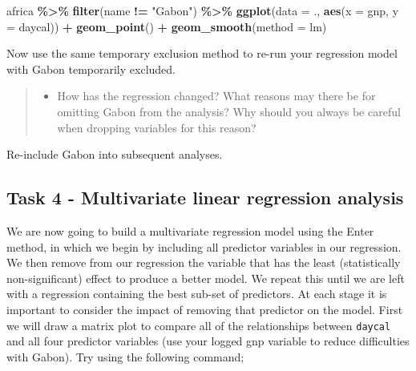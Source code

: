 \documentclass[
]{book}
\newenvironment{Shaded}{\begin{snugshade}}{\end{snugshade}}
\newcommand{\AttributeTok}[1]{\textcolor[rgb]{0.13,0.29,0.53}{#1}}
\newcommand{\FunctionTok}[1]{\textcolor[rgb]{0.13,0.29,0.53}{\textbf{#1}}}
\newcommand{\NormalTok}[1]{#1}
\newcommand{\SpecialCharTok}[1]{\textcolor[rgb]{0.81,0.36,0.00}{\textbf{#1}}}
\newcommand{\StringTok}[1]{\textcolor[rgb]{0.31,0.60,0.02}{#1}}
\providecommand{\tightlist}{%
  \setlength{\itemsep}{0pt}\setlength{\parskip}{0pt}}
\begin{document}
\begin{Shaded}
\begin{Highlighting}[]
\NormalTok{africa }\SpecialCharTok{\%\textgreater{}\%}
  \FunctionTok{filter}\NormalTok{(name }\SpecialCharTok{!=} \StringTok{"Gabon"}\NormalTok{) }\SpecialCharTok{\%\textgreater{}\%}
  \FunctionTok{ggplot}\NormalTok{(}\AttributeTok{data =}\NormalTok{ ., }\FunctionTok{aes}\NormalTok{(}\AttributeTok{x =}\NormalTok{ gnp, }\AttributeTok{y =}\NormalTok{ daycal)) }\SpecialCharTok{+}
  \FunctionTok{geom\_point}\NormalTok{() }\SpecialCharTok{+}
  \FunctionTok{geom\_smooth}\NormalTok{(}\AttributeTok{method =}\NormalTok{ lm)}
\end{Highlighting}
\end{Shaded}

Now use the same temporary exclusion method to re-run your regression model with Gabon temporarily excluded.

\begin{quote}
\begin{itemize}
\tightlist
\item
  How has the regression changed? What reasons may there be for omitting Gabon from the analysis? Why should you always be careful when dropping variables for this reason?
\end{itemize}
\end{quote}

Re-include Gabon into subsequent analyses.

\hypertarget{task-4---multivariate-linear-regression-analysis}{%
\subsection{Task 4 - Multivariate linear regression analysis}\label{task-4---multivariate-linear-regression-analysis}}

We are now going to build a multivariate regression model using the Enter method, in which we begin by including all predictor variables in our regression. We then remove from our regression the variable that has the least (statistically non-significant) effect to produce a better model. We repeat this until we are left with a regression containing the best sub-set of predictors. At each stage it is important to consider the impact of removing that predictor on the model.
First we will draw a matrix plot to compare all of the relationships between \texttt{daycal} and all four predictor variables (use your logged gnp variable to reduce difficulties with Gabon). Try using the following command;
\end{document}

